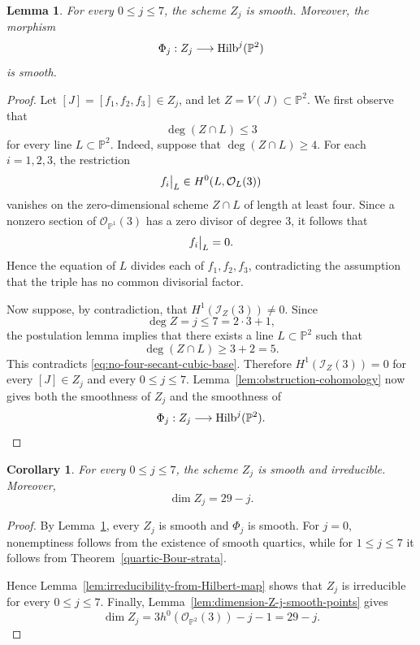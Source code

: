 \documentclass[11pt]{amsart} %
\newcommand\restr[2]{{%
  \left.\kern-\nulldelimiterspace %
  #1 %
  \vphantom{\big|} %
  \right|_{#2} %
}}
\newtheorem{Lemma}[Theorem]{Lemma}
\newtheorem{Corollary}[Theorem]{Corollary}
\theoremstyle{definition}
\def\NZQ{\mathbb}               %
\def\PP{{\NZQ P}}
\def\Hilbert{{\rm Hilb}}
\begin{document}
\begin{Lemma}\label{lem:d-3-generic-smoothness}
For every $0\leq j\leq7$, the scheme $Z_j$ is smooth. Moreover,
the morphism
\[
\Phi_j:Z_j\longrightarrow\Hilbert^j(\PP^2)
\]
is smooth.
\end{Lemma}

\begin{proof}
Let $[J]=[f_1,f_2,f_3]\in Z_j$, and let \(Z=V(J)\subset\PP^2\). We first observe that
\begin{equation}\label{eq:no-four-secant-cubic-base}
\deg(Z\cap L)\leq3
\end{equation}
for every line $L\subset\PP^2$. Indeed, suppose that \(
\deg(Z\cap L)\geq4\). For each $i=1,2,3$, the restriction
\[
\restr {f_i} {L}\in H^0(L,\mathcal O_L(3))
\]
vanishes on the zero-dimensional scheme $Z\cap L$ of length at
least four. Since a nonzero section of
$\mathcal O_{\PP^1}(3)$ has a zero divisor of degree $3$, it follows
that
\[
\restr {f_i} {L}=0.
\]
Hence the equation of $L$ divides each of $f_1,f_2,f_3$, contradicting
the assumption that the triple has no common divisorial factor.

Now suppose, by contradiction, that \(
H^1(\mathcal I_Z(3))\neq0\). Since
\[
\deg Z=j\leq7=2\cdot3+1,
\]
the postulation lemma
\cite[Lemma~34]{BernardiGimiglianoIda2011} implies that there exists a line $L\subset\PP^2$ such that
\[
\deg(Z\cap L)\geq3+2=5.
\]
This contradicts \eqref{eq:no-four-secant-cubic-base}. Therefore \(
H^1(\mathcal I_Z(3))=0\) for every $[J]\in Z_j$ and every $0\leq j\leq7$. Lemma~\ref{lem:obstruction-cohomology} now gives both the smoothness
of $Z_j$ and the smoothness of
\[
\Phi_j:Z_j\longrightarrow\Hilbert^j(\PP^2).
\]
\end{proof}

\begin{Corollary}\label{cor:d3-Zj-smooth-irreducible}
For every $0\leq j\leq7$, the scheme $Z_j$ is smooth and
irreducible. Moreover,
\[
\dim Z_j=29-j.
\]
\end{Corollary}

\begin{proof}
By Lemma~\ref{lem:d-3-generic-smoothness}, every $Z_j$ is smooth and $\Phi_j$ is smooth. For $j=0$, nonemptiness follows from the
existence of smooth quartics, while for $1\leq j\leq7$ it follows
from Theorem~\ref{quartic-Bour-strata}.

Hence Lemma~\ref{lem:irreducibility-from-Hilbert-map} shows that
$Z_j$ is irreducible for every $0\leq j\leq7$. Finally,
Lemma~\ref{lem:dimension-Z-j-smooth-points} gives
\[
\dim Z_j
=
3h^0(\mathcal O_{\PP^2}(3))-j-1
=
29-j.
\]
\end{proof}
\end{document}

